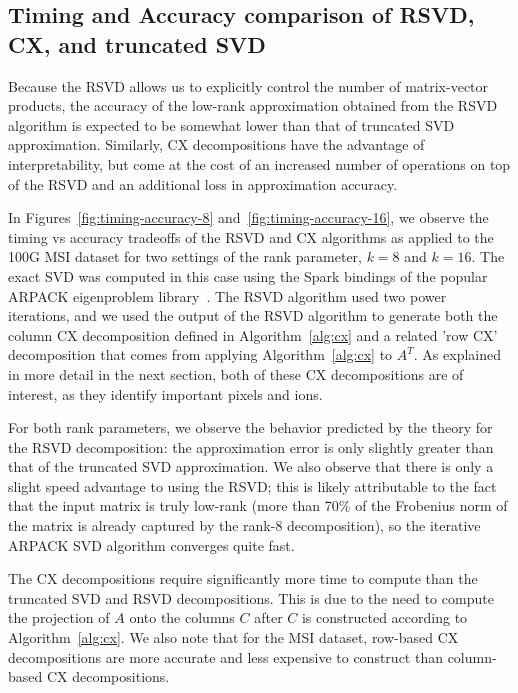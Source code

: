     
  

  
  \subsection{Timing and Accuracy comparison of RSVD, CX, and truncated SVD}

 Because the RSVD allows us to explicitly control the number of matrix-vector
 products, the accuracy of the low-rank approximation obtained from the RSVD
 algorithm is expected to be somewhat lower than that of truncated SVD
 approximation. Similarly, CX decompositions have the advantage of
 interpretability, but come at the cost of an increased number of operations on
 top of the RSVD and an additional loss in approximation accuracy. 

  In Figures~\ref{fig:timing-accuracy-8} and~\ref{fig:timing-accuracy-16}, we observe the timing vs accuracy tradeoffs of the RSVD and CX algorithms
  as applied to the 100G MSI dataset for two settings of the rank parameter, $k=8$ and $k=16.$ The exact SVD was computed in this case using the
  Spark bindings of the popular ARPACK eigenproblem library~\cite{ArpackUserGuide}. The RSVD algorithm used two power iterations, and we used the output of the RSVD algorithm to generate
  both the column CX decomposition defined in Algorithm~\ref{alg:cx} and a related 'row CX' decomposition that comes from applying Algorithm~\ref{alg:cx}
  to $A^T.$ As explained in more detail in the next section, both of these CX decompositions are of interest, as they identify important pixels and ions.

  For both rank parameters, we observe the behavior predicted by the theory for the RSVD decomposition: the approximation error is only slightly greater than that of the 
  truncated SVD approximation. We also observe that there is only a slight speed advantage to using the RSVD; this is likely attributable to the fact that the input matrix
  is truly low-rank (more than 70\% of the Frobenius norm of the matrix is already captured by the rank-8 decomposition), so the iterative ARPACK SVD algorithm converges 
  quite fast.

  The CX decompositions require significantly more time to compute than the truncated SVD and RSVD decompositions. This is due to the need to compute the projection of $A$ onto
  the columns $C$ after $C$ is constructed according to Algorithm~\ref{alg:cx}. We also note that for the MSI dataset, row-based CX decompositions are more 
  accurate and less expensive to construct than column-based CX decompositions. 

